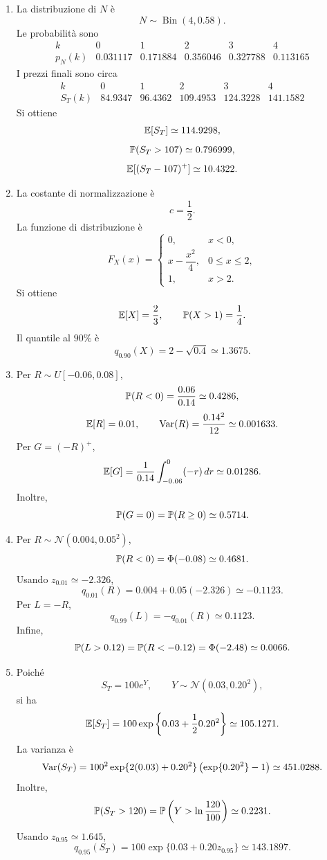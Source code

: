 \begin{enumerate}
\item
La distribuzione di $N$ \`{e}
\[
N\sim \operatorname{Bin}(4,0.58).
\]
Le probabilit\`{a} sono
\[
\begin{array}{c|ccccc}
k & 0 & 1 & 2 & 3 & 4\\
\hline
p_N(k) & 0.031117 & 0.171884 & 0.356046 & 0.327788 & 0.113165
\end{array}
\]
I prezzi finali sono circa
\[
\begin{array}{c|ccccc}
k & 0 & 1 & 2 & 3 & 4\\
\hline
S_T(k) & 84.9347 & 96.4362 & 109.4953 & 124.3228 & 141.1582
\end{array}
\]
Si ottiene
\[
\mathbb{E}[S_T]\simeq 114.9298,
\]
\[
\mathbb{P}(S_T>107)\simeq 0.796999,
\]
\[
\mathbb{E}[(S_T-107)^+]\simeq 10.4322.
\]

\item
La costante di normalizzazione \`{e}
\[
c=\frac{1}{2}.
\]
La funzione di distribuzione \`{e}
\[
F_X(x)=
\begin{cases}
0, & x<0,\\[4pt]
x-\dfrac{x^2}{4}, & 0\leq x\leq 2,\\[8pt]
1, & x>2.
\end{cases}
\]
Si ottiene
\[
\mathbb{E}[X]=\frac{2}{3},
\qquad
\mathbb{P}(X>1)=\frac{1}{4}.
\]
Il quantile al $90\%$ \`{e}
\[
q_{0.90}(X)
=
2-\sqrt{0.4}
\simeq
1.3675.
\]

\item
Per $R\sim U[-0.06,0.08]$,
\[
\mathbb{P}(R<0)=\frac{0.06}{0.14}\simeq 0.4286,
\]
\[
\mathbb{E}[R]=0.01,
\qquad
\operatorname{Var}(R)=\frac{0.14^2}{12}\simeq 0.001633.
\]
Per $G=(-R)^+$,
\[
\mathbb{E}[G]
=
\frac{1}{0.14}\int_{-0.06}^{0}(-r)\,dr
\simeq
0.01286.
\]
Inoltre,
\[
\mathbb{P}(G=0)=\mathbb{P}(R\geq 0)\simeq 0.5714.
\]

\item
Per $R\sim\mathcal{N}(0.004,0.05^2)$,
\[
\mathbb{P}(R<0)
=
\Phi(-0.08)
\simeq
0.4681.
\]
Usando $z_{0.01}\simeq -2.326$,
\[
q_{0.01}(R)
=
0.004+0.05(-2.326)
\simeq
-0.1123.
\]
Per $L=-R$,
\[
q_{0.99}(L)
=
-q_{0.01}(R)
\simeq
0.1123.
\]
Infine,
\[
\mathbb{P}(L>0.12)
=
\mathbb{P}(R<-0.12)
=
\Phi(-2.48)
\simeq
0.0066.
\]

\item
Poich\'{e}
\[
S_T=100e^Y,
\qquad
Y\sim\mathcal{N}(0.03,0.20^2),
\]
si ha
\[
\mathbb{E}[S_T]
=
100\exp\left\{0.03+\frac{1}{2}0.20^2\right\}
\simeq
105.1271.
\]
La varianza \`{e}
\[
\operatorname{Var}(S_T)
=
100^2
\exp\{2(0.03)+0.20^2\}
\left(\exp\{0.20^2\}-1\right)
\simeq
451.0288.
\]
Inoltre,
\[
\mathbb{P}(S_T>120)
=
\mathbb{P}\left(Y>\ln\frac{120}{100}\right)
\simeq
0.2231.
\]
Usando $z_{0.95}\simeq 1.645$,
\[
q_{0.95}(S_T)
=
100\exp\{0.03+0.20z_{0.95}\}
\simeq
143.1897.
\]
\end{enumerate}


